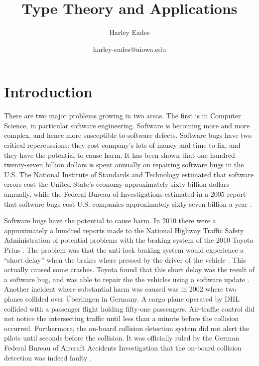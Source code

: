 \documentclass{article}
\title{Type Theory and Applications}
\author{Harley Eades}
\date{harley-eades@uiowa.edu}
\begin{document}
\maketitle 

\section{Introduction}
\label{sec:introduction}
There are two major problems growing in two areas.  The first is in
Computer Science, in particular software engineering. Software is
becoming more and more complex, and hence more susceptible to software
defects.  Software bugs have two critical repercussions: they cost
company's lots of money and time to fix, and they have the potential to
cause harm. It has been shown that one-hundred-twenty-seven billion
dollars is spent annually on repairing software bugs in the U.S.  The
National Institute of Standards and Technology estimated that software
errors cost the United State's economy approximately sixty billion
dollars annually, while the Federal Bureau of Investigations estimated
in a 2005 report that software bugs cost U.S. companies approximately
sixty-seven billion a year \cite{nist02,fbi05}.

Software bugs have the potential to cause harm.  In 2010 there were a
approximately a hundred reports made to the National Highway Traffic
Safety Administration of potential problems with the braking system of
the 2010 Toyota Prius \cite{Consumer:2010}.  The problem was that the
anti-lock braking system would experience a ``short delay'' when
the brakes where pressed by the driver of the vehicle
\cite{thedetroitbureau.com:2009}.  This actually caused some crashes.
Toyota found that this short delay was the result of a software bug,
and was able to repair the the vehicles using a software update
\cite{Reuters:2009}.  Another incident where substantial harm was
caused was in 2002 where two planes collided over \"{U}berlingen in
Germany. A cargo plane operated by DHL collided with a passenger
flight holding fifty-one passengers.  Air-traffic control did not
notice the intersecting traffic until less than a minute before the
collision occurred.  Furthermore, the on-board collision detection
system did not alert the pilots until seconds before the collision.
It was officially ruled by the German Federal Bureau of Aircraft
Accidents Investigation that the on-board collision detection was
indeed faulty \cite{Collision:2004}.
\end{document}
